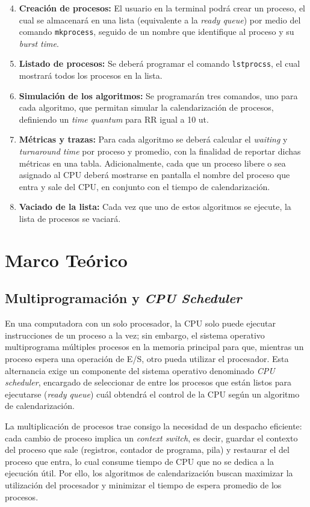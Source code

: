 \documentclass[12pt]{article}
\begin{document}
    \begin{enumerate}
        \setcounter{enumi}{3}
        \item \textbf{Creación de procesos:} El usuario en la terminal podrá crear un proceso, el cual se almacenará en una lista (equivalente a la \textit{ready queue}) por medio del comando \texttt{mkprocess}, seguido de un nombre que identifique al proceso y su \textit{burst time}.
        \item \textbf{Listado de procesos:} Se deberá programar el comando \texttt{lstprocss}, el cual mostrará todos los procesos en la lista.
        \item \textbf{Simulación de los algoritmos:} Se programarán tres comandos, uno para cada algoritmo, que permitan simular la calendarización de procesos, definiendo un \textit{time quantum} para RR igual a 10 ut.
        \item \textbf{Métricas y trazas:} Para cada algoritmo se deberá calcular el \textit{waiting} y \textit{turnaround time} por proceso y promedio, con la finalidad de reportar dichas métricas en una tabla. Adicionalmente, cada que un proceso libere o sea asignado al CPU deberá mostrarse en pantalla el nombre del proceso que entra y sale del CPU, en conjunto con el tiempo de calendarización.
        \item \textbf{Vaciado de la lista:} Cada vez que uno de estos algoritmos se ejecute, la lista de procesos se vaciará.
    \end{enumerate}

\newpage
\section{Marco Teórico}
    \subsection{Multiprogramación y \textit{CPU Scheduler}}
    En una computadora con un solo procesador, la CPU solo puede ejecutar instrucciones de un proceso a la vez; sin embargo, el sistema operativo multiprograma múltiples procesos en la memoria principal para que, mientras un proceso espera una operación de E/S, otro pueda utilizar el procesador. Esta alternancia exige un componente del sistema operativo denominado \textit{CPU scheduler}, encargado de seleccionar de entre los procesos que están listos para ejecutarse (\textit{ready queue}) cuál obtendrá el control de la CPU según un algoritmo de calendarización. \par
    La multiplicación de procesos trae consigo la necesidad de un despacho eficiente: cada cambio de proceso implica un \textit{context switch}, es decir, guardar el contexto del proceso que sale (registros, contador de programa, pila) y restaurar el del proceso que entra, lo cual consume tiempo de CPU que no se dedica a la ejecución útil. Por ello, los algoritmos de calendarización buscan maximizar la utilización del procesador y minimizar el tiempo de espera promedio de los procesos.
\end{document}
